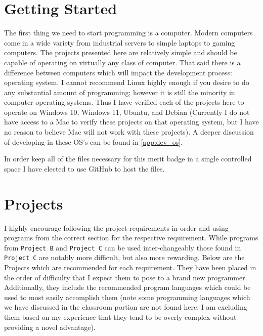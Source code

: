   \section{Getting Started}
  \label{sec:getting_started}

    The first thing we need to start programming is a computer.
    Modern computers come in a wide variety from industrial servers to simple laptops to gaming computers.
    The projects presented here are relatively simple and should be capable of operating on virtually
      any class of computer.
    That said there is a difference between computers which will impact the development process: operating system.
    I cannot recommend Linux highly enough if you desire to do any substantial amount of programming;
      however it is still the minority in computer operating systems.
    Thus I have verified each of the projects here to operate on Windows 10, Windows 11, Ubuntu, and Debian
      (Currently I do not have access to a Mac to verify these projects on that operating system, but I have no
      reason to believe Mac will not work with these projects).
    A deeper discussion of developing in these OS's can be found in \autoref{app:dev_os}.

    In order keep all of the files necessary for this merit badge in a single controlled space
      I have elected to use GitHub to host the files.


  \section{Projects}
  \label{sec:projects}

    I highly encourage following the project requirements in order and using programs from the correct section
      for the respective requirement.
    While programs from \texttt{Project B} and \texttt{Project C} can be used inter-changeably those found in 
      \texttt{Project C} are notably more difficult, but also more rewarding.
    Below are the Projects which are recommended for each requirement.
    They have been placed in the order of difficulty that I expect them to pose to a brand new programmer.
    Additionally, they include the recommended program languages which could be used to most easily accomplish them
      (note some programming languages which we have discussed in the classroom portion are not found here, 
      I am excluding them based on my experience that they tend to be overly complex without providing a novel advantage).

